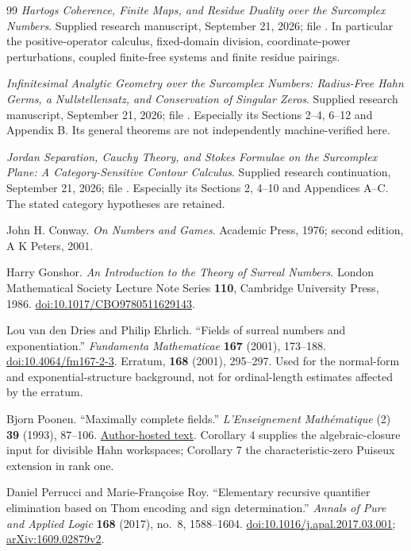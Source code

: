 \documentclass[11pt,letterpaper]{article}
\numberwithin{equation}{section}
\theoremstyle{definition}
\theoremstyle{remark}
\begin{document}
\begin{thebibliography}{99}
\emph{Hartogs Coherence, Finite Maps, and Residue Duality over the Surcomplex
Numbers}. Supplied research manuscript, September 21, 2026; file
. In particular the positive-operator calculus,
fixed-domain division, coordinate-power perturbations, coupled finite-free
systems and finite residue pairings.

\emph{Infinitesimal Analytic Geometry over the Surcomplex Numbers: Radius-Free
Hahn Germs, a Nullstellensatz, and Conservation of Singular Zeros}. Supplied
research manuscript, September 21, 2026; file
. Especially its Sections 2--4, 6--12 and
Appendix B. Its general theorems are not independently machine-verified here.

\emph{Jordan Separation, Cauchy Theory, and Stokes Formulae on the Surcomplex
Plane: A Category-Sensitive Contour Calculus}. Supplied research continuation,
September 21, 2026; file . Especially its
Sections 2, 4--10 and Appendices A--C. The stated category hypotheses are
retained.

John H. Conway. \emph{On Numbers and Games}. Academic Press, 1976; second
edition, A K Peters, 2001.

Harry Gonshor. \emph{An Introduction to the Theory of Surreal Numbers}. London
Mathematical Society Lecture Note Series \textbf{110}, Cambridge University
Press, 1986.
\href{https://doi.org/10.1017/CBO9780511629143}{doi:10.1017/CBO9780511629143}.

Lou van den Dries and Philip Ehrlich. ``Fields of surreal numbers and
exponentiation.'' \emph{Fundamenta Mathematicae} \textbf{167} (2001), 173--188.
\href{https://doi.org/10.4064/fm167-2-3}{doi:10.4064/fm167-2-3}. Erratum,
\textbf{168} (2001), 295--297. Used for the normal-form and
exponential-structure background, not for ordinal-length estimates affected by
the erratum.

Bjorn Poonen. ``Maximally complete fields.'' \emph{L'Enseignement
Math\'ematique} (2) \textbf{39} (1993), 87--106.
\href{https://math.mit.edu/~poonen/papers/amsval.pdf}{Author-hosted text}.
Corollary 4 supplies the algebraic-closure input for divisible Hahn workspaces;
Corollary 7 the characteristic-zero Puiseux extension in rank one.

Daniel Perrucci and Marie-Fran\c{c}oise Roy. ``Elementary recursive quantifier
elimination based on Thom encoding and sign determination.'' \emph{Annals of
Pure and Applied Logic} \textbf{168} (2017), no.~8, 1588--1604.
\href{https://doi.org/10.1016/j.apal.2017.03.001}{doi:10.1016/j.apal.2017.03.001};
\href{https://arxiv.org/abs/1609.02879}{arXiv:1609.02879v2}.


\end{thebibliography}
\end{document}
